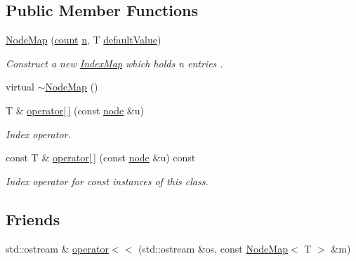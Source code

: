 \subsection*{Public Member Functions}
\begin{DoxyCompactItemize}
\item 
\hyperlink{class_ensemble_clustering_1_1_node_map_ae5324b98b88f23032dcb0e3847b5eff9}{Node\-Map} (\hyperlink{namespace_ensemble_clustering_a2482e94ca22a0c6544a5a9173186fde8}{count} \hyperlink{class_ensemble_clustering_1_1_index_map_a3151d302c54e6ad0175bd87aef62d4ca}{n}, T \hyperlink{class_ensemble_clustering_1_1_index_map_ab5f1dc778237131e9d6c5713c2b318ec}{default\-Value})
\begin{DoxyCompactList}\small\item\em Construct a new \hyperlink{class_ensemble_clustering_1_1_index_map}{Index\-Map} which holds n entries . \end{DoxyCompactList}\item 
virtual \hyperlink{class_ensemble_clustering_1_1_node_map_a3c540495a55c9aaecee101e1483c135c}{$\sim$\-Node\-Map} ()
\item 
T \& \hyperlink{class_ensemble_clustering_1_1_node_map_a2d37467f509efb2fbdd54dd2b28fe8ea}{operator\mbox{[}$\,$\mbox{]}} (const \hyperlink{namespace_ensemble_clustering_ae829290aeccd1a420b17a37fd901f114}{node} \&u)
\begin{DoxyCompactList}\small\item\em Index operator. \end{DoxyCompactList}\item 
const T \& \hyperlink{class_ensemble_clustering_1_1_node_map_a3494496fcc4041f747f45a5edd9d3b22}{operator\mbox{[}$\,$\mbox{]}} (const \hyperlink{namespace_ensemble_clustering_ae829290aeccd1a420b17a37fd901f114}{node} \&u) const 
\begin{DoxyCompactList}\small\item\em Index operator for const instances of this class. \end{DoxyCompactList}\end{DoxyCompactItemize}
\subsection*{Friends}
\begin{DoxyCompactItemize}
\item 
std\-::ostream \& \hyperlink{class_ensemble_clustering_1_1_node_map_a04c08e83d9f515f810401ff16ed5f745}{operator$<$$<$} (std\-::ostream \&os, const \hyperlink{class_ensemble_clustering_1_1_node_map}{Node\-Map}$<$ T $>$ \&m)
\end{DoxyCompactItemize}
